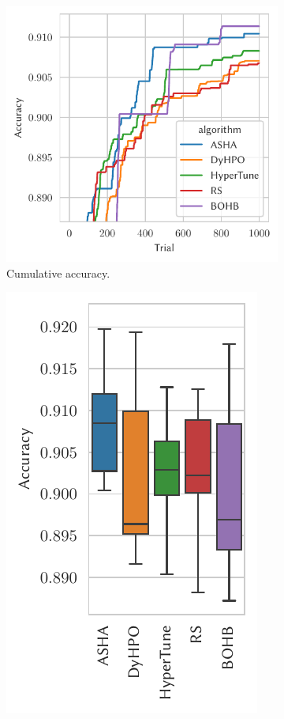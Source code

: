 \begin{figure}[H]
    \begin{subfigure}{.47\textwidth}
        \includegraphics[height=\plotheight]{img/real_exp/cifar10_residual_plot.pdf}%
        \caption{Cumulative accuracy.}%
    \end{subfigure}%
    \begin{subfigure}{.26\textwidth}
        \includegraphics[height=\plotheight]{img/real_exp/cifar10_residual_boxplot_half.pdf}%

\end{subfigure}
\end{figure}
